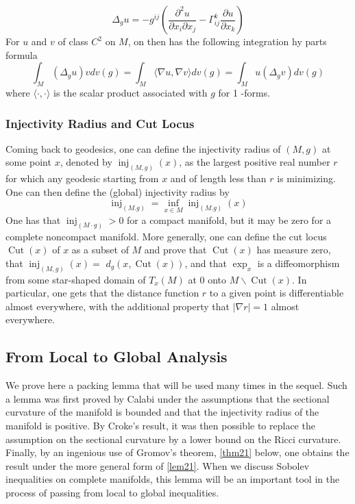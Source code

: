 \documentclass[12pt,hyperref,a4paper,UTF8]{ctexart}
\begin{document}
$$
\Delta_g u=-g^{i j}\left(\frac{\partial^2 u}{\partial x_i \partial x_j}-\Gamma_{i j}^k \frac{\partial u}{\partial x_k}\right)
$$
For $u$ and $v$ of class $C^2$ on $M$, on then has the following integration hy parts formula
$$
\int_M\left(\Delta_g u\right) v d v(g)=\int_M\langle\nabla u, \nabla v\rangle d v(g)=\int_M u\left(\Delta_g v\right) d v(g)
$$
where $\langle\cdot, \cdot\rangle$ is the scalar product associated with $g$ for 1 -forms.


\subsubsection{Injectivity Radius and Cut Locus}
Coming back to geodesics, one can define the injectivity radius of $(M, g)$ at some point $x$, denoted by $\operatorname{inj}_{(M, g)}(x)$, as the largest positive real number $r$ for which any geodesic starting from $x$ and of length less than $r$ is minimizing. One can then define the (global) injectivity radius by
$$
\operatorname{inj}_{(M . g)}=\inf _{x \in M} \operatorname{inj}_{(M . g)}(x)
$$
One has that $\operatorname{inj}_{(M \cdot g)}>0$ for a compact manifold, but it may be zero for a complete noncompact manifold. More generally, one can define the cut locus $\operatorname{Cut}(x)$ of $x$ as a subset of $M$ and prove that $\operatorname{Cut}(x)$ has measure zero, that $\operatorname{inj}_{(M, g)}(x)=$ $d_g(x, \operatorname{Cut}(x))$, and that $\exp _x$ is a diffeomorphism from some star-shaped domain of $T_x(M)$ at 0 onto $M \backslash \operatorname{Cut}(x)$. In particular, one gets that the distance function $r$
to a given point is differentiable almost everywhere, with the additional property that $|\nabla r|=1$ almost everywhere.

\subsection{From Local to Global Analysis}

We prove here a packing lemma that will be used many times in the sequel. Such a lemma was first proved by Calabi under the assumptions that the sectional curvature of the manifold is bounded and that the injectivity radius of the manifold is positive.\cite{H1} By Croke's result\cite{Croke}, it was then possible to replace the assumption on the sectional curvature by a lower bound on the Ricci curvature. 
Finally, by an ingenious use of Gromov's theorem, \autoref{thm21} below, one obtains the result under the more general form of \autoref{lem21}. When we discuss Sobolev inequalities on complete manifolds, this lemma will be an important tool in the process of passing from local to global inequalities.
\end{document}
